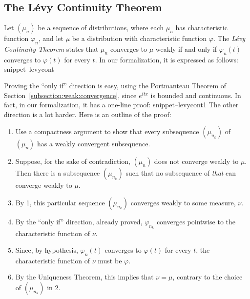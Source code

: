 \documentclass{svjour3}
\newcommand{\ph}{\varphi}
\newcommand{\Snippet}[1]{\csname snippet--#1\endcsname}
\begin{document}
\subsection{The L\'evy Continuity Theorem}

Let $(\mu_n)$ be a sequence of distributions, where each $\mu_n$ has characteristic function $\ph_n$, and let $\mu$ be a distribution with characteristic function $\ph$. The \emph{L\'evy Continuity Theorem} states that $\mu_n$ converges to $\mu$ weakly if and only if $\ph_n(t)$ converges to $\ph(t)$ for every $t$. In our formalization, it is expressed as follows:
\Snippet{levycont}

Proving the ``only if'' direction is easy, using the Portmanteau Theorem of Section~\ref{subsection:weak:convergence}, since $e^{itx}$ is bounded and continuous. In fact, in our formalization, it has a one-line proof:
\Snippet{levycont1}
The other direction is a lot harder. Here is an outline of the proof:
\begin{enumerate}
 \item Use a compactness argument to show that every subsequence $(\mu_{n_k})$ of $(\mu_n)$ has a weakly convergent subsequence.
 \item Suppose, for the sake of contradiction, $(\mu_n)$ does not converge weakly to $\mu$. Then there is a subsequence $(\mu_{n_k})$ such that no subsequence of \emph{that} can converge weakly to $\mu$.
 \item By 1, this particular sequence $(\mu_{n_k})$ converges weakly to some measure, $\nu$.
 \item By the ``only if'' direction, already proved, $\ph_{n_k}$ converges pointwise to the characteristic function of $\nu$.
 \item Since, by hypothesis, $\ph_n(t)$ converges to $\ph(t)$ for every $t$, the characteristic function of $\nu$ must be $\ph$.
 \item By the Uniqueness Theorem, this implies that $\nu = \mu$, contrary to the choice of $(\mu_{n_k})$ in 2.
\end{enumerate}
\end{document}
